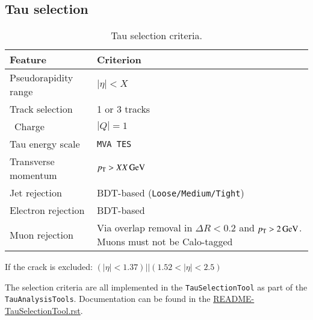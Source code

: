 \subsection{Tau selection}

\begin{table}[ht]
  \caption{Tau selection criteria.}%
  \label{tab:object:tau}
  \centering
  \begin{tabular}{ll}
  \toprule
  Feature & Criterion \\
  \midrule
  Pseudorapidity range & \(|\eta| < X\) \\
  Track selection & 1 or 3 tracks \\\
  Charge & \(|Q| = 1\) \\
  Tau energy scale & \texttt{MVA TES}\\
  Transverse momentum & \(\pT > \qty[parse-numbers=false]{XX}{\GeV}\) \\
  Jet rejection & BDT-based (\texttt{Loose/Medium/Tight}) \\
  Electron rejection & BDT-based\\
  Muon rejection & Via overlap removal in \(\Delta R < 0.2\) and \(\pT > \qty{2}{\GeV}\).
    Muons must not be Calo-tagged\\
  \bottomrule
  \end{tabular}
\end{table}

If the crack is excluded: \((|\eta| < 1.37) || (1.52 < |\eta| < 2.5)\)

The selection criteria are all implemented in the \texttt{TauSelectionTool} as part of the \texttt{TauAnalysisTools}.
Documentation can be found in the \href{https://gitlab.cern.ch/atlas/athena/blob/21.2/PhysicsAnalysis/TauID/TauAnalysisTools/doc/README-TauSelectionTool.rst}{README-TauSelectionTool.rst}.
